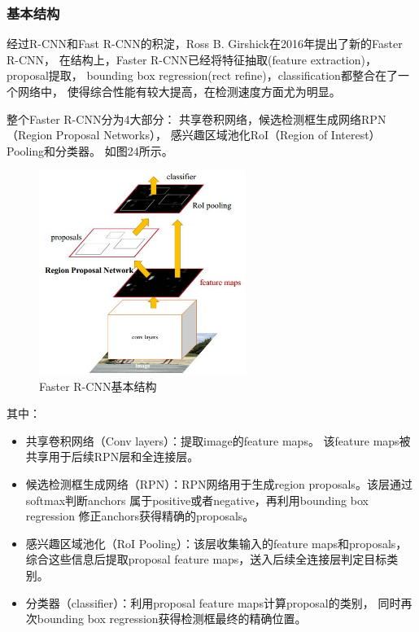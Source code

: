 \documentclass[UTF8]{ctexart}
\begin{document}
\subsubsection{基本结构}
经过R-CNN和Fast R-CNN的积淀，Ross B. Girshick在2016年提出了新的Faster R-CNN，
在结构上，Faster R-CNN已经将特征抽取(feature extraction)，proposal提取，
bounding box regression(rect refine)，classification都整合在了一个网络中，
使得综合性能有较大提高，在检测速度方面尤为明显。

整个Faster R-CNN分为4大部分：
共享卷积网络，候选检测框生成网络RPN（Region Proposal Networks），
感兴趣区域池化RoI（Region of Interest）Pooling和分类器。
如图24所示。

\begin{figure}[htbp]
    \centering
    \includegraphics[width=0.60\textwidth]{../img/fasterR-CNN.jpg}
    \caption{Faster R-CNN基本结构}
\end{figure}

其中：
\begin{itemize}
    \item 共享卷积网络（Conv layers）：提取image的feature maps。
    该feature maps被共享用于后续RPN层和全连接层。
    \item 候选检测框生成网络（RPN）：RPN网络用于生成region proposals。该层通过softmax判断anchors
    属于positive或者negative，再利用bounding box regression
    修正anchors获得精确的proposals。
    \item 感兴趣区域池化（RoI Pooling）：该层收集输入的feature maps和proposals，
    综合这些信息后提取proposal feature maps，送入后续全连接层判定目标类别。
    \item 分类器（classifier）：利用proposal feature maps计算proposal的类别，
    同时再次bounding box regression获得检测框最终的精确位置。
\end{itemize}
\end{document}
